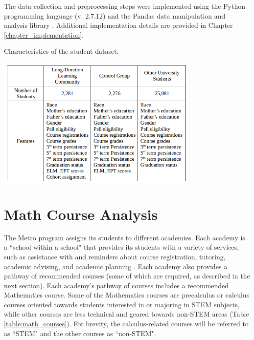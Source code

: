 The data collection and preprocessing steps were implemented using the Python programming language (v. 2.7.12) and the Pandas data manipulation and analysis library \cite{Pandas}.  Additional implementation details are provided in Chapter \ref{chapter_implementation}.       

\begin{table}[htbp]
\centering
\caption{Characteristics of the student dataset.}
\includegraphics[width=0.75\textwidth]{tables/student_data_sets.png}
\label{table:students}
\end{table}

\section{Math Course Analysis}

The Metro program assigns its students to different academies.  Each academy is a ``school within a school" that provides its students with a variety of services, such as assistance with and reminders about course registration, tutoring, academic advising, and academic planning \cite{Metro}.  Each academy also provides a pathway of recommended courses (some of which are required, as described in the next section). Each academy's pathway of courses includes a recommended Mathematics course.  Some of the Mathematics courses are precalculus or calculus courses oriented towards students interested in or majoring in STEM subjects, while other courses are less technical and geared towards non-STEM areas (Table \ref{table:math_courses}).  For brevity, the calculus-related courses will be referred to as ``STEM" and the other courses as ``non-STEM".  

